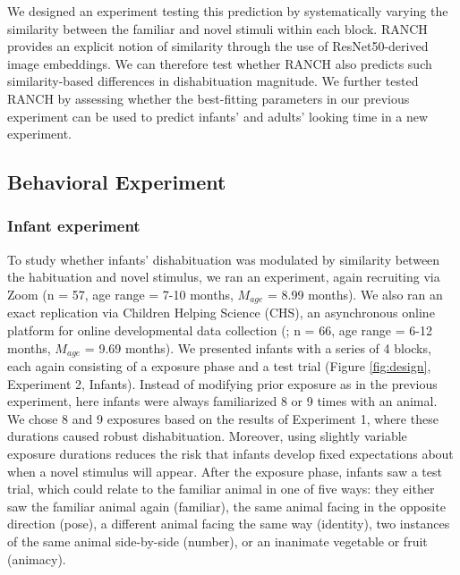 \documentclass[
]{article}
\begin{document}
We designed an experiment testing this prediction by systematically varying the similarity between the familiar and novel stimuli within each block. RANCH provides an explicit notion of similarity through the use of ResNet50-derived image embeddings. We can therefore test whether RANCH also predicts such similarity-based differences in dishabituation magnitude. We further tested RANCH by assessing whether the best-fitting parameters in our previous experiment can be used to predict infants' and adults' looking time in a new experiment.

\hypertarget{behavioral-experiment}{%
\subsection{Behavioral Experiment}\label{behavioral-experiment}}

\hypertarget{infant-experiment-1}{%
\subsubsection{Infant experiment}\label{infant-experiment-1}}

To study whether infants' dishabituation was modulated by similarity between the habituation and novel stimulus, we ran an experiment, again recruiting via Zoom (n = 57, age range = 7-10 months, \(M_{age}\) = 8.99 months). We also ran an exact replication via Children Helping Science (CHS), an asynchronous online platform for online developmental data collection {(}\textcite{scott2017lookit}; n = 66, age range = 6-12 months, \(M_{age}\) = 9.69 months). We presented infants with a series of 4 blocks, each again consisting of a exposure phase and a test trial (Figure \ref{fig:design}, Experiment 2, Infants). Instead of modifying prior exposure as in the previous experiment, here infants were always familiarized 8 or 9 times with an animal. We chose 8 and 9 exposures based on the results of Experiment 1, where these durations caused robust dishabituation. Moreover, using slightly variable exposure durations reduces the risk that infants develop fixed expectations about when a novel stimulus will appear. After the exposure phase, infants saw a test trial, which could relate to the familiar animal in one of five ways: they either saw the familiar animal again (familiar), the same animal facing in the opposite direction (pose), a different animal facing the same way (identity), two instances of the same animal side-by-side (number), or an inanimate vegetable or fruit (animacy).
\end{document}
